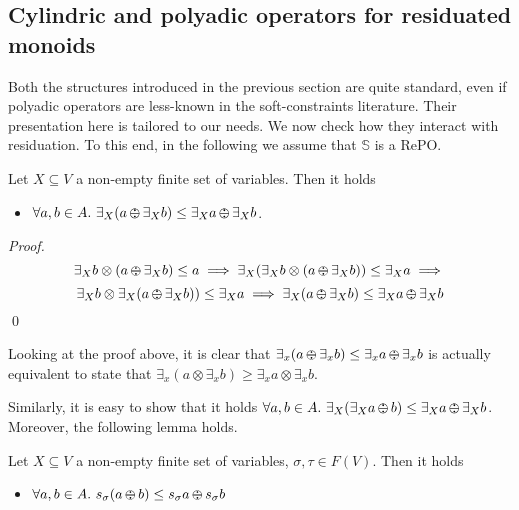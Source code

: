 \documentclass{llncs}
\def\monop{\otimes}
\def\odiv{\, {\ominus\hspace{-7.7pt} \div} \,}
\begin{document}
\subsection{Cylindric and polyadic operators for residuated monoids}
\label{cyre}
Both the structures introduced in the previous section are quite standard, 
even if polyadic operators are less-known in the soft-constraints literature.
Their presentation here is tailored to our needs. We now check how they
interact with residuation. To this end, in the following we assume that $\mathbb{S}$ is a RePO.


\begin{lemma}
Let $X \subseteq V$ a non-empty finite set of variables. Then it holds
	\begin{itemize}
         \item $\forall a, b \in A.\ \exists_X(a \odiv \exists_X b) \leq \exists_X a \odiv \exists_X b$.
	\end{itemize}
\end{lemma}

\begin{proof}
 \[\exists_X b \otimes (a \odiv \exists_X b) \leq a \implies
   \exists_X(\exists_X b \otimes (a \odiv \exists_X b)) \leq \exists_X a \implies\]
 \[\exists_X b \otimes \exists_X(a \odiv \exists_X b)) \leq \exists_X a \implies
   \exists_X(a \odiv \exists_X b) \leq \exists_X a \odiv \exists_X b\]
   \qed
\end{proof}

\begin{remark}
Looking at the proof above, it is clear that $\exists_x(a \odiv \exists_x b) \leq \exists_x a \odiv \exists_x b$
is actually equivalent to state that
$\exists_x(a \monop \exists_x b) \geq \exists_x a \monop \exists_x b$.
\end{remark}


\noindent Similarly, it is easy to show that it holds $\forall a, b \in A.\ \exists_X(\exists_X a \odiv b) \leq \exists_X a \odiv \exists_X b$. 
Moreover, the following lemma holds.

\begin{lemma}
Let $X \subseteq V$ a non-empty finite set of variables, $\sigma,\tau \in F(V)$. Then it holds
	\begin{itemize}
		\item $\forall a,b \in A.\ s_\sigma (a \odiv b) \leq s_\sigma a \odiv s_\sigma b$ 
	\end{itemize}
\end{lemma}
\end{document}
